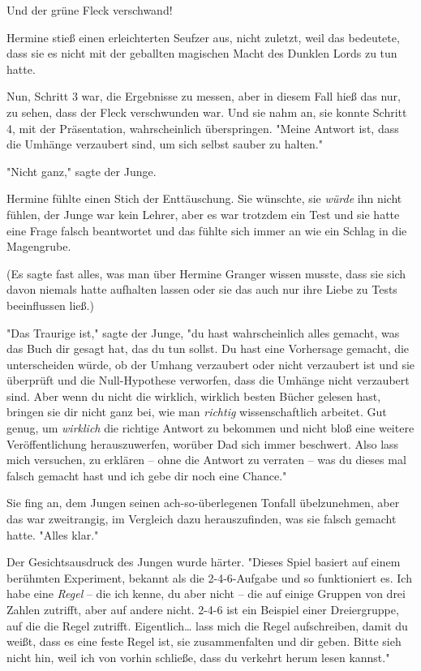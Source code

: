 {Und der grüne Fleck verschwand!

Hermine stieß einen erleichterten Seufzer aus, nicht zuletzt, weil das bedeutete, dass sie es nicht mit der geballten magischen Macht des Dunklen Lords zu tun hatte.

Nun, Schritt 3 war, die Ergebnisse zu messen, aber in diesem Fall hieß das nur, zu sehen, dass der Fleck verschwunden war. Und sie nahm an, sie konnte Schritt 4, mit der Präsentation, wahrscheinlich überspringen. "Meine Antwort ist, dass die Umhänge verzaubert sind, um sich selbst sauber zu halten."

"Nicht ganz," sagte der Junge.

Hermine fühlte einen Stich der Enttäuschung. Sie wünschte, sie \emph{würde} ihn nicht fühlen, der Junge war kein Lehrer, aber es war trotzdem ein Test und sie hatte eine Frage falsch beantwortet und das fühlte sich immer an wie ein Schlag in die Magengrube.

(Es sagte fast alles, was man über Hermine Granger wissen musste, dass sie sich davon niemals hatte aufhalten lassen oder sie das auch nur ihre Liebe zu Tests beeinflussen ließ.)

"Das Traurige ist," sagte der Junge, "du hast wahrscheinlich alles gemacht, was das Buch dir gesagt hat, das du tun sollst. Du hast eine Vorhersage gemacht, die unterscheiden würde, ob der Umhang verzaubert oder nicht verzaubert ist und sie überprüft und die Null-Hypothese verworfen, dass die Umhänge nicht verzaubert sind. Aber wenn du nicht die wirklich, wirklich besten Bücher gelesen hast, bringen sie dir nicht ganz bei, wie man \emph{richtig} wissenschaftlich arbeitet. Gut genug, um \emph{wirklich} die richtige Antwort zu bekommen und nicht bloß eine weitere Veröffentlichung herauszuwerfen, worüber Dad sich immer beschwert. Also lass mich versuchen, zu erklären -- ohne die Antwort zu verraten -- was du dieses mal falsch gemacht hast und ich gebe dir noch eine Chance."

Sie fing an, dem Jungen seinen ach-so-überlegenen Tonfall übelzunehmen, aber das war zweitrangig, im Vergleich dazu herauszufinden, was sie falsch gemacht hatte. "Alles klar."

Der Gesichtsausdruck des Jungen wurde härter. "Dieses Spiel basiert auf einem berühmten Experiment, bekannt als die 2-4-6-Aufgabe und so funktioniert es. Ich habe eine \emph{Regel} -- die ich kenne, du aber nicht -- die auf einige Gruppen von drei Zahlen zutrifft, aber auf andere nicht. 2-4-6 ist ein Beispiel einer Dreiergruppe, auf die die Regel zutrifft. Eigentlich… lass mich die Regel aufschreiben, damit du weißt, dass es eine feste Regel ist, sie zusammenfalten und dir geben. Bitte sieh nicht hin, weil ich von vorhin schließe, dass du verkehrt herum lesen kannst."

}
